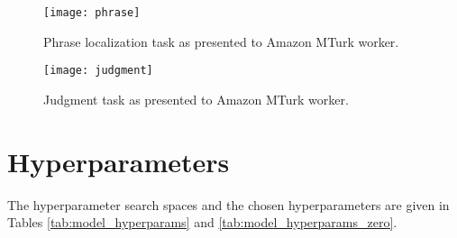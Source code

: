 \documentclass[11pt]{article}
\begin{document}
\begin{figure*}
  \centering \texttt{[image: phrase]}
  \caption{Phrase localization task as presented to Amazon MTurk worker.} \label{fig:phrase}
\end{figure*}

\begin{figure*}
  \centering \texttt{[image: judgment]}
  \caption{Judgment task as presented to Amazon MTurk worker.} \label{fig:judgment}
\end{figure*}

\section{Hyperparameters}

The hyperparameter search spaces and the chosen hyperparameters are given in Tables \ref{tab:model_hyperparams} and \ref{tab:model_hyperparams_zero}.
\end{document}
